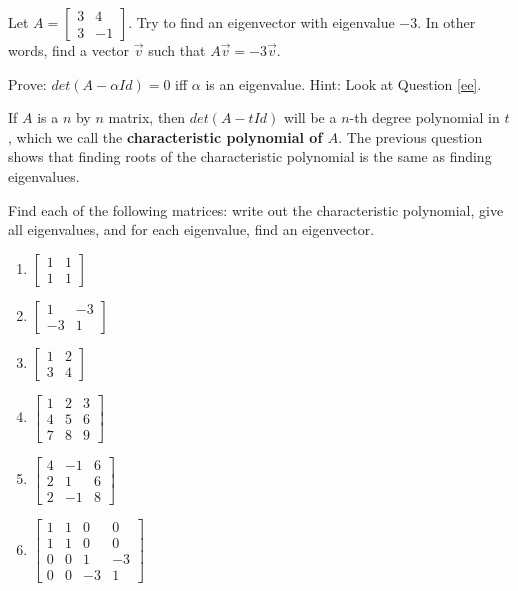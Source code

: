 \bq Let $A=\begin{bmatrix} 3&4\\3&-1 \end{bmatrix}$. Try to find an eigenvector with eigenvalue $-3$. In other words, find a vector $\vec{v}$ such that $A\vec{v}=-3\vec{v}$.
\eq

\bq Prove: $det(A- \alpha Id)=0$ iff $\alpha$ is an eigenvalue. Hint: Look at Question \ref{ee}.
\eq

If $A$ is a $n$ by $n$ matrix, then $det(A- t Id)$ will be a $n$-th degree polynomial in $t$, which we call the \textbf{characteristic polynomial of $A$}. The previous question shows that finding roots of the characteristic polynomial is the same as finding eigenvalues.

\bq Find each of the following matrices: write out the characteristic polynomial, give all eigenvalues, and for each eigenvalue, find an eigenvector.
\begin{enumerate}
\item $\begin{bmatrix} 1&1 \\1&1 \end{bmatrix}$
\item $\begin{bmatrix} 1&-3 \\-3&1 \end{bmatrix}$
\item $\begin{bmatrix} 1&2 \\3&4 \end{bmatrix}$
\item $\begin{bmatrix} 1&2&3 \\4&5&6\\7&8&9 \end{bmatrix}$
\item $\begin{bmatrix} 4&-1&6\\2&1&6\\2&-1&8 \end{bmatrix}$
\item $\begin{bmatrix} 1&1&0&0\\1&1&0&0\\0&0&1&-3\\0&0&-3&1 \end{bmatrix}$
\end{enumerate}
\eq
\begin{annotation}
\end{annotation}

